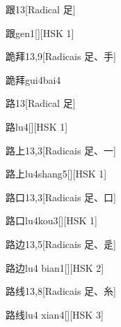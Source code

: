 \begin{entry}{跟}{13}[Radical ⾜]
  \begin{phonetics}{跟}{gen1}[][HSK 1]
  \end{phonetics}
\end{entry}

\begin{entry}{跪拜}{13,9}[Radicais ⾜、⼿]
  \begin{phonetics}{跪拜}{gui4bai4}
  \end{phonetics}
\end{entry}

\begin{entry}{路}{13}[Radical ⾜]
  \begin{phonetics}{路}{lu4}[][HSK 1]
  \end{phonetics}
\end{entry}

\begin{entry}{路上}{13,3}[Radicais ⾜、⼀]
  \begin{phonetics}{路上}{lu4shang5}[][HSK 1]
  \end{phonetics}
\end{entry}

\begin{entry}{路口}{13,3}[Radicais ⾜、⼝]
  \begin{phonetics}{路口}{lu4kou3}[][HSK 1]
  \end{phonetics}
\end{entry}

\begin{entry}{路边}{13,5}[Radicais ⾜、⾡]
  \begin{phonetics}{路边}{lu4 bian1}[][HSK 2]
  \end{phonetics}
\end{entry}

\begin{entry}{路线}{13,8}[Radicais ⾜、⽷]
  \begin{phonetics}{路线}{lu4 xian4}[][HSK 3]
  \end{phonetics}
\end{entry}

